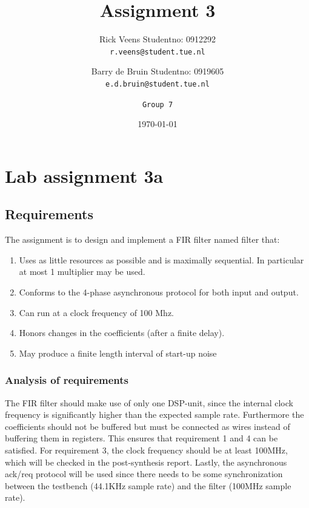 \documentclass[a4paper,twoside,11pt, fleqn]{article}
\title{\vspace{-\baselineskip}\sffamily\bfseries Assignment 3}
\author{
	Rick Veens \qquad Studentno: 0912292\\
	\texttt{r.veens@student.tue.nl}
	\and
	Barry de Bruin \qquad Studentno: 0919605\\
	\texttt{e.d.bruin@student.tue.nl}
	\and
	\texttt{Group 7}
}
\date{\today}
\begin{document}
\maketitle
\newpage

\section{Lab assignment 3a}

\subsection{Requirements}
\label{sec:req3a}

The assignment is to design and implement a FIR filter named filter that:
\begin{enumerate}
\item Uses as little resources as possible and is maximally sequential. In particular at most 1
multiplier may be used.
\item Conforms to the 4-phase asynchronous protocol for both input and output.
\item Can run at a clock frequency of 100 Mhz.
\item Honors changes in the coefficients (after a finite delay).
\item May produce a finite length interval of start-up noise
\end{enumerate}

\subsubsection{Analysis of requirements}
The FIR filter should make use of only one DSP-unit, since the internal clock frequency is significantly higher than the expected sample rate. Furthermore the coefficients should not be buffered but must be connected as wires instead of buffering them in registers. This ensures that requirement 1 and 4 can be satisfied. For requirement 3, the clock frequency should be at least 100MHz, which will be checked in the post-synthesis report. Lastly, the asynchronous ack/req protocol will be used since there needs to be some synchronization between the testbench (44.1KHz sample rate) and the filter (100MHz sample rate).
\end{document}
